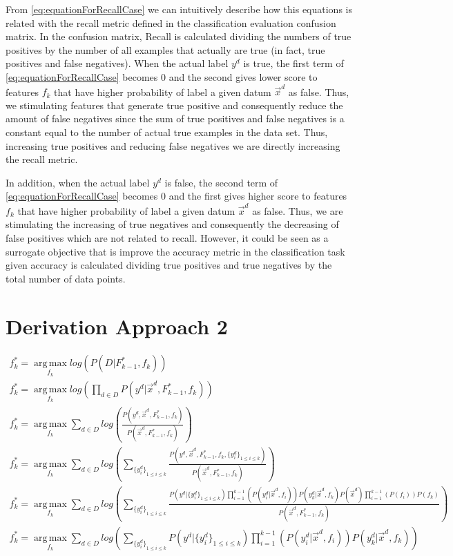 \documentclass{article}
\begin{document}
From \eqref{eq:equationForRecallCase} we can intuitively describe how this equations is related with the recall metric defined in the classification evaluation confusion matrix. In the confusion matrix, Recall is calculated dividing the numbers of true positives by the number of all examples that actually are true (in fact, true positives and false negatives). When the actual label $y^d$ is true, the first term of \eqref{eq:equationForRecallCase} becomes 0 and the second gives lower score to features $f_k$ that have higher probability of label a given datum $\vec{x}^d$ as false. Thus, we stimulating features that generate true positive and consequently reduce the amount of false negatives since the sum  of true positives and false negatives is a constant equal to the number of actual true examples in the data set. Thus, increasing true positives and reducing  false negatives we are directly increasing the recall metric. 

In addition, when the actual label $y^d$ is false, the second term of \eqref{eq:equationForRecallCase} becomes 0 and the first gives higher score to features $f_k$ that have higher probability of label a given datum $\vec{x}^d$ as false. Thus, we are stimulating the increasing of true negatives and consequently the decreasing of false positives which are not related to recall. However, it could be seen as a surrogate objective that is improve the accuracy metric in the classification task given accuracy is calculated dividing true positives and true negatives by the total number of data points. 

\section{Derivation Approach 2}
\begin{gather*}
 f_{k}^* = \operatorname*{arg\,max}_{f_k} log\left( P( D | F_{k-1}^{*},f_k)\right)\\
 f_{k}^* = \operatorname*{arg\,max}_{f_k}  log\left(\prod_{d \in D} P(y^d | \vec{x}^d,F_{k-1}^{*},f_k)\right)\\
f_{k}^* = \operatorname*{arg\,max}_{f_k} \sum_{d \in D} log\left(\frac{P(y^d, \vec{x}^d, F_{k-1}^{*},f_k)}{P(\vec{x}^d, F_{k-1}^{*},f_k)}\right)\\
f_{k}^* = \operatorname*{arg\,max}_{f_k} \sum_{d \in D} log\left(\sum_{{\{y_{i}^d\}}_{1\leq i \leq k}} \frac{P(y^d, \vec{x}^d, F_{k-1}^{*},f_k,\{y_{i}^d\}_{1\leq i \leq k})}{P(\vec{x}^d, F_{k-1}^{*},f_k)}\right)\\
f_{k}^* = \operatorname*{arg\,max}_{f_k} \sum_{d \in D} log\left(\sum_{{\{y_{i}^d\}}_{1\leq i \leq k}} \frac{P(y^d| \{y^d_i\}_{1 \leq i \leq k}) \prod_{i=1}^{k-1}\left(P(y_i^d |\vec{x}^d, f_i)\right)P(y_k^d |\vec{x}^d, f_k) P(\vec{x}^d) \prod_{i=1}^{k-1}\left(P(f_i)\right) P(f_k)}{P(\vec{x}^d, F_{k-1}^{*},f_k)}\right)\\
f_{k}^* = \operatorname*{arg\,max}_{f_k} \sum_{d \in D} log\left(\sum_{{\{y_{i}^d\}}_{1\leq i \leq k}} P(y^d| \{y^d_i\}_{1 \leq i \leq k}) \prod_{i=1}^{k-1}\left(P(y_i^d |\vec{x}^d, f_i)\right)P(y_k^d |\vec{x}^d, f_k)\right)\\  
\end{gather*}
\end{document}
